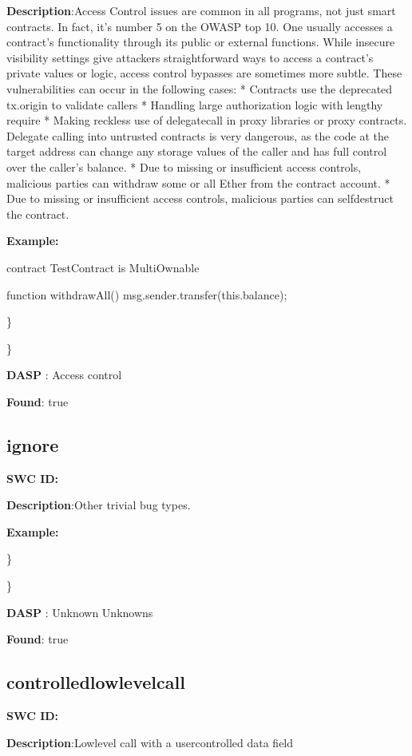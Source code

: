 \documentclass{article}
\begin{document}
{{\textbf{Description}:Access Control issues are common in all programs, not just smart contracts. In fact, it's number 5 on the OWASP top 10. One usually accesses a contract's functionality through its public or external functions. While insecure visibility settings give attackers straightforward ways to access a contract's private values or logic, access control bypasses are sometimes more subtle. These vulnerabilities can occur in the following cases:
* Contracts use the deprecated tx.origin to validate callers
* Handling large authorization logic with lengthy require
* Making reckless use of delegatecall in proxy libraries or proxy contracts. Delegate calling into untrusted contracts is very dangerous, as the code at the target address can change any storage values of the caller and has full control over the caller's balance.
* Due to missing or insufficient access controls, malicious parties can withdraw some or all Ether from the contract account.
* Due to missing or insufficient access controls, malicious parties can self\textendash destruct the contract.


\textbf{Example:} 

contract TestContract is MultiOwnable {

  function withdrawAll(){
    msg.sender.transfer(this.balance);
  }
}

\} 

\} 

\textbf{DASP} : Access control

\textbf{Found}: true

\subsection{ignore} 
\textbf{SWC \textunderscore ID:} 

\textbf{Description}:Other trivial bug types.


\textbf{Example:} 


\} 

\} 

\textbf{DASP} : Unknown Unknowns

\textbf{Found}: true

\subsection{controlled\textunderscore lowlevel\textunderscore call} 
\textbf{SWC \textunderscore ID:} 

\textbf{Description}:Low\textendash level call with a user\textendash controlled data field


}}
\end{document}
